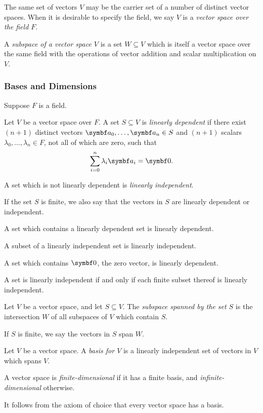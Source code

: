 The same set of vectors \(V\) may be the carrier set of a number of distinct vector spaces. When it is desirable to
specify the field, we say \(V\) is a \emph{vector space over the field \(F\)}.

A \emph{subspace of a vector space \(V\)} is a set \(W \subseteq V\) which is itself a vector space over the same field
with the operations of vector addition and scalar multiplication on \(V\).

\subsubsection{Bases and Dimensions}

Suppose \(F\) is a field.

\Bdf
  Let \(V\) be a vector space over \(F\). A set \(S \subseteq V\) is \emph{linearly dependent} if there exist \((n
  + 1)\) distinct vectors \(\vct{a}_0, \ldots, \vct{a}_n \in S\) and \((n + 1)\) scalars \(\lambda_0, \ldots, \lambda_n
  \in F\), not all of which are zero, such that
  \[
    \sum_{i = 0}^{n} \lambda_i \vct{a}_i = \vct{0}.
  \]

  A set which is not linearly dependent is \emph{linearly independent}.

  If the set \(S\) is finite, we also say that the vectors in \(S\) are linearly dependent or independent.
\Edf

A set which contains a linearly dependent set is linearly dependent.

A subset of a linearly independent set is linearly independent.

A set which contains \(\vct{0}\), the zero vector, is linearly dependent.

A set is linearly independent if and only if each finite subset thereof is linearly independent.

\Bdf
  Let \(V\) be a vector space, and let \(S \subseteq V\). The \emph{subspace spanned by the set \(S\)} is the
  intersection \(W\) of all subspaces of \(V\) which contain \(S\).

  If \(S\) is finite, we say the vectors in \(S\) span \(W\).
\Edf

\Bdf
  Let \(V\) be a vector space. A \emph{basis for \(V\)} is a linearly independent set of vectors in \(V\) which spans
  \(V\).

  A vector space is \emph{finite-dimensional} if it has a finite basis, and \emph{infinite-dimensional} otherwise.
\Edf

It follows from the axiom of choice that every vector space has a basis.

